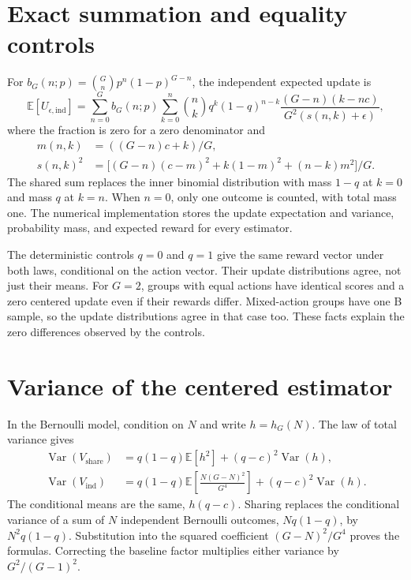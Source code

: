 \documentclass[10pt,letterpaper]{article}
\newcommand{\E}{\mathbb{E}}
\newcommand{\Var}{\operatorname{Var}}
\newcommand{\ind}{\mathrm{ind}}
\newcommand{\shr}{\mathrm{share}}
\begin{document}
\clearpage
\appendix
\section{Exact summation and equality controls}
For $b_G(n;p)=\binom Gn p^n(1-p)^{G-n}$, the independent expected update is
\begin{equation}
\E[U_{\epsilon,\ind}]=\sum_{n=0}^G b_G(n;p)
\sum_{k=0}^n\binom nk q^k(1-q)^{n-k}
\frac{(G-n)(k-nc)}{G^2(s(n,k)+\epsilon)},
\end{equation}
where the fraction is zero for a zero denominator and
\begin{align}
m(n,k)&=((G-n)c+k)/G,\\
s(n,k)^2&=\bigl[(G-n)(c-m)^2+k(1-m)^2+(n-k)m^2\bigr]/G.
\end{align}
The shared sum replaces the inner binomial distribution with mass $1-q$ at
$k=0$ and mass $q$ at $k=n$. When $n=0$, only one outcome is counted, with
total mass one. The numerical implementation stores the update expectation and variance,
probability mass, and expected reward for every estimator.

The deterministic controls $q=0$ and $q=1$ give the same reward vector under
both laws, conditional on the action vector. Their update distributions agree,
not just their means. For $G=2$, groups with equal actions have identical
scores and a zero centered update even if their rewards differ. Mixed-action
groups have one B sample, so the update distributions agree in that case too.
These facts explain the zero differences observed by the controls.

\section{Variance of the centered estimator}
\label{app:centeredvar}
In the Bernoulli model, condition on $N$ and write $h=h_G(N)$. The law of total
variance gives
\begin{align}
\Var(V_{\shr})&=q(1-q)\E[h^2]+(q-c)^2\Var(h),\\
\Var(V_{\ind})&=q(1-q)\E\!\left[\frac{N(G-N)^2}{G^4}\right]
 +(q-c)^2\Var(h).
\end{align}
The conditional means are the same, $h(q-c)$. Sharing replaces the conditional
variance of a sum of $N$ independent Bernoulli outcomes, $Nq(1-q)$, by
$N^2q(1-q)$. Substitution into the squared coefficient $(G-N)^2/G^4$ proves
the formulas. Correcting the baseline factor multiplies either variance by
$G^2/(G-1)^2$.
\end{document}
